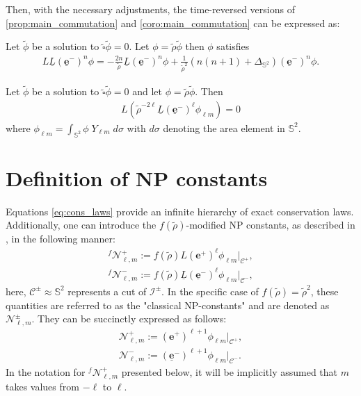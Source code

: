 Then, with the necessary adjustments, the time-reversed versions of \ref{prop:main_commutation} and \ref{coro:main_commutation} can be expressed as:
\begin{proposition}\label{prop:main_commutation_minus}
  Let $\tilde{\phi}$ be a solution to
  $\tilde{\square}\tilde{\phi}=0$.  Let $\phi =
  \tilde{\rho}\tilde{\phi}$ then $\phi$ satisfies
 \begin{align}\label{eq:main_commutation_minus}
   L \underline{L} (\boldsymbol{\underline{e}}^{-})^n \phi = -\frac{2n}{\tilde{\rho}}\underline{L}
   (\boldsymbol{\underline{e}}^{-})^n \phi + \frac{1}{\tilde{\rho}^2}(n(n+1) +
   \Delta_{\mathbb{S}^2})(\boldsymbol{\underline{e}}^{-})^n \phi.
 \end{align}
\end{proposition}
\begin{corollary}\label{coro:main_commutation_minus}
  Let $\tilde{\phi}$ be a solution to
  $\tilde{\square}\tilde{\phi}=0$ and let $\phi =
  \tilde{\rho}\tilde{\phi}$. Then
  \begin{align}\label{eq:coromain_commutation_minus}
  L (\tilde{\rho}^{-2\ell} \underline{L} (\boldsymbol{\underline{e}}^{-})^{\ell}\phi_{\ell m}) = 0
  \end{align}
  where $\phi_{\ell m}= \int_{\mathbb{S}^2} \phi \; Y_{\ell m} \;
  d\sigma$ with $d\sigma$ denoting the area element in $\mathbb{S}^2$.
\end{corollary}
\section{Definition of NP constants}
\label{sec:NP_constants}

Equations \eqref{eq:cons_laws} provide an infinite hierarchy of exact conservation laws. Additionally, one can introduce the $f(\tilde{\rho})$-modified NP constants, as described in \cite{GajKehLeo22}, in the following manner: 
\begin{align}\label{eq:DefModifiedNP}
  {}^{f}\mathcal{N}^{+}_{\ell,m}:= f(\tilde{\rho})L (\boldsymbol{e}^{+})^{\ell}\phi_{\ell m} \Big|_{\mathcal{C}^{+}}, \\ 
  {}^{f}\mathcal{N}^{-}_{\ell,m}:= f(\tilde{\rho})\underline{L} (\boldsymbol{\underline{e}}^{-})^{\ell}\phi_{\ell m}\Big|_{\mathcal{C}^{-}},
\end{align}
here, $\mathcal{C^{\pm}} \approx \mathbb{S}^2$ represents a cut of $\mathscr{I}^{\pm}$. In the specific case of $f(\tilde{\rho})=\tilde{\rho}^2$, these quantities are referred to as the "classical NP-constants" and are denoted as $\mathcal{N}^{\pm}_{\ell,m}$. They can be succinctly expressed as follows:
\begin{align}\label{eq:classicalNP}
  \mathcal{N}^{+}_{\ell,m}:= (\boldsymbol{e}^{+})^{\ell+1}\phi_{\ell m}\Big|_{\mathcal{C}^{+}},\\ 
  \mathcal{N}^{-}_{\ell,m}:= (\boldsymbol{\underline{e}}^{-})^{\ell+1}\phi_{\ell m} \Big|_{\mathcal{C}^{-}}.
\end{align}
In the notation for ${}^{f}\mathcal{N}^{+}_{\ell,m}$ presented below, it will be implicitly assumed that $m$ takes values from $-\ell$ to $\ell$.
